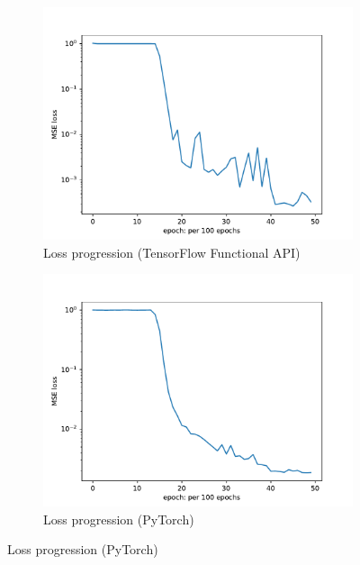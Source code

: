 \documentclass[10pt,journal,compsoc,onecolumn]{IEEEtran}
\begin{document}
\begin{figure}[htbp]
    \centering
    \begin{subfigure}[b]{0.3\textwidth}
        \includegraphics[width=\textwidth]{../../results/functional/low-frequency-adabelief-20250206-1105-1/loss}
        \caption{Loss progression (TensorFlow Functional API)}
        \label{fig:loss_functional}
    \end{subfigure}
    \begin{subfigure}[b]{0.3\textwidth}
        \includegraphics[width=\textwidth]{../../results/pytorch/low-frequency-adabelief-20250206-1600-1/loss}
        \caption{Loss progression (PyTorch)}
        \label{fig:loss_pytorch}
    \end{subfigure}

\end{figure}
\end{document}
